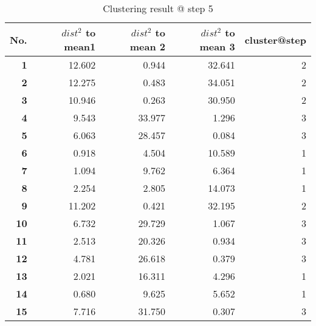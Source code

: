 \begin{table}[htbp]
  \centering
  \caption{Clustering result @ step 5}
    \begin{tabular}{rrrrr}
    \toprule
    \textbf{No.} & \textbf{$dist^2$ to mean1} & \textbf{$dist^2$ to mean 2} & \textbf{$dist^2$ to mean 3} & \textbf{cluster@step} \\
    \midrule
    \textbf{1} & 12.602  & 0.944  & 32.641  & 2 \\
    \textbf{2} & 12.275  & 0.483  & 34.051  & 2 \\
    \textbf{3} & 10.946  & 0.263  & 30.950  & 2 \\
    \textbf{4} & 9.543  & 33.977  & 1.296  & 3 \\
    \textbf{5} & 6.063  & 28.457  & 0.084  & 3 \\
    \textbf{6} & 0.918  & 4.504  & 10.589  & 1 \\
    \textbf{7} & 1.094  & 9.762  & 6.364  & 1 \\
    \textbf{8} & 2.254  & 2.805  & 14.073  & 1 \\
    \textbf{9} & 11.202  & 0.421  & 32.195  & 2 \\
    \textbf{10} & 6.732  & 29.729  & 1.067  & 3 \\
    \textbf{11} & 2.513  & 20.326  & 0.934  & 3 \\
    \textbf{12} & 4.781  & 26.618  & 0.379  & 3 \\
    \textbf{13} & 2.021  & 16.311  & 4.296  & 1 \\
    \textbf{14} & 0.680  & 9.625  & 5.652  & 1 \\
    \textbf{15} & 7.716  & 31.750  & 0.307  & 3 \\
    \bottomrule
    \end{tabular}%
  \label{tab:cluster_b5}%
\end{table}%
